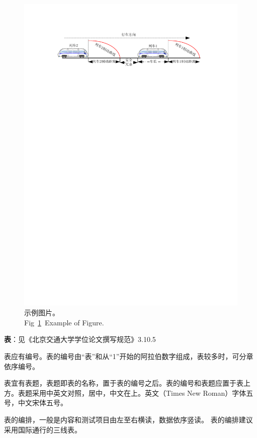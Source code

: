 \begin{figure}[!htb] %
  \centering
  \includegraphics[scale=1]{figures/figure1.pdf}
  \caption{示例图片。\\Fig~\ref{fig:02:01}~Example of Figure.}
  \label{fig:02:01}
\end{figure}


\textbf{表}：见《北京交通大学学位论文撰写规范》3.10.5

表应有编号。表的编号由“表”和从“1”开始的阿拉伯数字组成，表较多时，可分章依序编号。

表宜有表题，表题即表的名称，置于表的编号之后。表的编号和表题应置于表上方。表题采用中英文对照，居中，中文在上。英文（Times New Roman）字体五号，中文宋体五号。

表的编排，一般是内容和测试项目由左至右横读，数据依序竖读。
表的编排建议采用国际通行的三线表。

